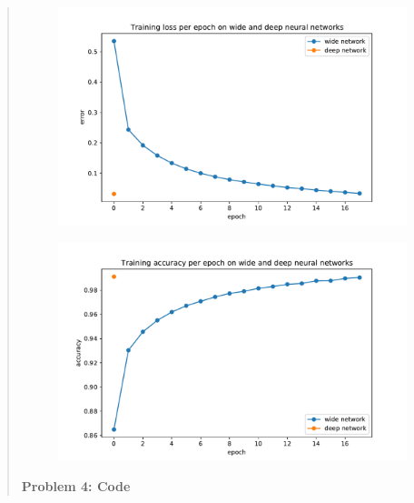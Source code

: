 \begin{quote}
    \begin{figure}[h!]
	\centering
	\includegraphics[width=0.8\linewidth]{../plots/4_losses.pdf}
	\caption{}
    \end{figure}
    \begin{figure}[h!]
	\centering
	\includegraphics[width=0.8\linewidth]{../plots/4_accuracies.pdf}
	\caption{}
    \end{figure}

{\bf Problem 4: Code}


\end{quote}
